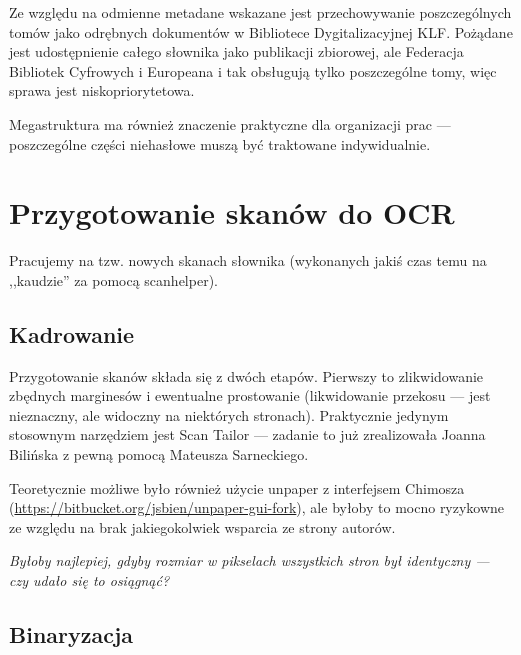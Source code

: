\documentclass[12]{mwart}
\newcommand{\program}[1]{\textsf{#1}}
\begin{document}
Ze względu na odmienne metadane wskazane jest przechowywanie
poszczególnych tomów jako odrębnych dokumentów w Bibliotece
Dygitalizacyjnej KLF. Pożądane jest udostępnienie całego słownika jako
publikacji zbiorowej, ale Federacja Bibliotek Cyfrowych i Europeana i
tak obsługują tylko poszczególne tomy, więc sprawa jest
niskopriorytetowa.

Megastruktura ma również znaczenie praktyczne dla organizacji prac ---
poszczególne części niehasłowe muszą być traktowane indywidualnie.

\section{Przygotowanie skanów do OCR}
\label{sec:przyg-skan-do}

Pracujemy na tzw. nowych skanach słownika
(wykonanych jakiś czas temu na ,,kaudzie'' za pomocą
\textsf{scanhelper}). 

\subsection{Kadrowanie}
\label{sec:kadrowanie}



Przygotowanie skanów składa się z dwóch etapów. Pierwszy to
zlikwidowanie zbędnych marginesów i ewentualne prostowanie
(likwidowanie przekosu --- jest nieznaczny, ale widoczny na niektórych
stronach). Praktycznie jedynym stosownym narzędziem jest \program{Scan
  Tailor} --- zadanie to już zrealizowała Joanna Bilińska z pewną
pomocą Mateusza Sarneckiego.

Teoretycznie możliwe było również użycie \textsf{unpaper} z
interfejsem Chimosza
(\url{https://bitbucket.org/jsbien/unpaper-gui-fork}), ale byłoby to
mocno ryzykowne ze względu na brak jakiegokolwiek wsparcia ze strony
autorów.

\textit{Byłoby najlepiej, gdyby rozmiar w pikselach wszystkich stron był
identyczny --- czy udało się to osiągnąć?}

\subsection{Binaryzacja}
\label{sec:binaryzacja}
\end{document}

